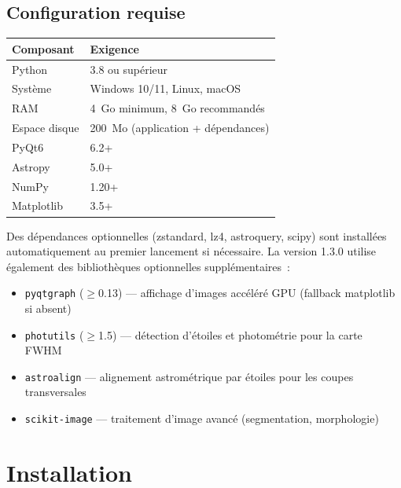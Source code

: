 \documentclass[a4paper,11pt]{article}
\begin{document}
\subsection{Configuration requise}

\begin{center}
\begin{tabularx}{0.85\textwidth}{l X}
\toprule
\textbf{Composant} & \textbf{Exigence} \\
\midrule
Python & 3.8 ou sup\'{e}rieur \\
Syst\`{e}me & Windows 10/11, Linux, macOS \\
RAM & 4~Go minimum, 8~Go recommand\'{e}s \\
Espace disque & 200~Mo (application + d\'{e}pendances) \\
PyQt6 & 6.2+ \\
Astropy & 5.0+ \\
NumPy & 1.20+ \\
Matplotlib & 3.5+ \\
\bottomrule
\end{tabularx}
\end{center}

\begin{notebox}
Des d\'{e}pendances optionnelles (zstandard, lz4, astroquery, scipy) sont install\'{e}es automatiquement au premier lancement si n\'{e}cessaire. La version 1.3.0 utilise \'{e}galement des biblioth\`{e}ques optionnelles suppl\'{e}mentaires~:
\begin{itemize}
    \item \texttt{pyqtgraph} ($\geq$0.13) --- affichage d'images acc\'{e}l\'{e}r\'{e} GPU (fallback matplotlib si absent)
    \item \texttt{photutils} ($\geq$1.5) --- d\'{e}tection d'\'{e}toiles et photom\'{e}trie pour la carte FWHM
    \item \texttt{astroalign} --- alignement astrom\'{e}trique par \'{e}toiles pour les coupes transversales
    \item \texttt{scikit-image} --- traitement d'image avanc\'{e} (segmentation, morphologie)
\end{itemize}
\end{notebox}


\section{Installation}
\label{sec:install}
\end{document}
